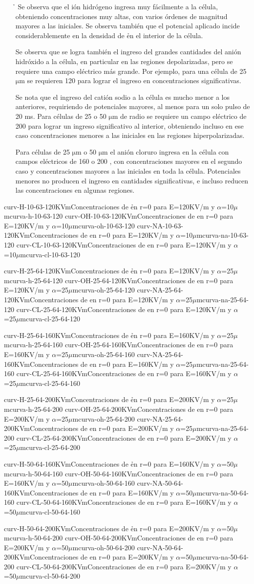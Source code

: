 \documentclass[a4paper,10pt]{article}
\begin{document}
\begin{itemize}
	\item[\h] 
	Se observa que el ión hidrógeno ingresa muy fácilmente a la célula, obteniendo concentraciones muy altas, con varios órdenes de magnitud mayores a las iniciales. Se observa también que el potencial aplicado incide considerablemente en la densidad de \h en el interior de la célula. 

	\item[\oh]
	Se observa que se logra también el ingreso del grandes cantidades del anión hidróxido a la célula, en particular en las regiones depolarizadas, pero se requiere una campo eléctrico más grande. Por ejemplo, para una célula de 25 $\si{\micro\metre}$ se requieren 120 \kvm para lograr el ingreso en concentraciones significativas.
	
	\item[\na]	
	Se nota que el ingreso del catión sodio a la célula es mucho menor a los anteriores, requiriendo de potenciales mayores, al menos para un solo pulso de 20 ms. Para células de 25 o 50 $\si{\micro\metre}$ de radio se requiere un campo eléctrico de 200 \kvm para lograr un ingreso significativo al interior, obteniendo incluso en ese caso concentraciones menores a las iniciales en las regiones hiperpolarizadas. 
	
	\item[\cl]
	Para células de 25 $\si{\micro\metre}$ o 50 $\si{\micro\metre}$ el anión cloruro ingresa en la célula con campos eléctricos de 160 \kvm  o  200 \kvm, con concentraciones mayores en el segundo caso y concentraciones mayores a las iniciales en toda la célula. Potenciales menores no producen el ingreso en cantidades significativas, e incluso reducen las concentraciones en algunas regiones.
\end{itemize}


\newcommand{\curvaQuad}[3]{
	\newpage
	\imagenDobleTop
		{curv-H-#1-#2-#3KVm}{Concentraciones de \h en r=0 para E=#3KV/m y $\alpha$=#1$\mu$m}{curva-h-#1-#2-#3}
		{curv-OH-#1-#2-#3KVm}{Concentraciones de \oh en r=0 para E=#3KV/m y $\alpha$=#1$\mu$m}{curva-oh-#1-#2-#3}
	\imagenDobleBottom
		{curv-NA-#1-#2-#3KVm}{Concentraciones de \na en r=0 para E=#3KV/m y $\alpha$=#1$\mu$m}{curva-na-#1-#2-#3}
		{curv-CL-#1-#2-#3KVm}{Concentraciones de \cl en r=0 para E=#3KV/m y $\alpha$=#1$\mu$m}{curva-cl-#1-#2-#3}
}

\curvaQuad{10}{63}{120}
\curvaQuad{25}{64}{120}
\curvaQuad{25}{64}{160}
\curvaQuad{25}{64}{200}
\curvaQuad{50}{64}{160}
\curvaQuad{50}{64}{200}
\end{document}
